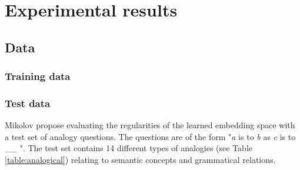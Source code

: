 
\section{Experimental results}

\subsection{Data}

\subsubsection{Training data}

\subsubsection{Test data}\label{sec:test_data}
Mikolov \etal \cite{mikolov3} propose evaluating the regularities of the learned embedding space with a test set of analogy questions. The questions are of the form "{\it a} is to {\it b} as {\it c} is to \_\_ ". The test set contains 14 different types of analogies (see Table \ref{table:analogical}) relating to semantic concepts and grammatical relations. 

